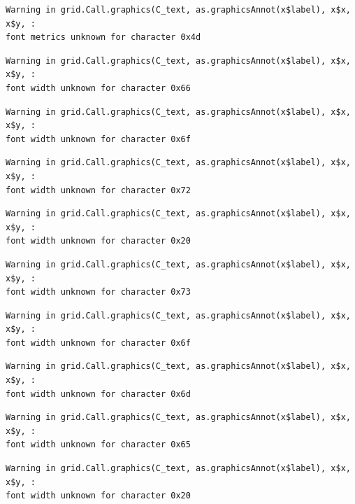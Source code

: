 \documentclass[
  letterpaper,
  DIV=11,
  numbers=noendperiod]{scrreprt}
\begin{document}
\begin{verbatim}
Warning in grid.Call.graphics(C_text, as.graphicsAnnot(x$label), x$x, x$y, :
font metrics unknown for character 0x4d
\end{verbatim}

\begin{verbatim}
Warning in grid.Call.graphics(C_text, as.graphicsAnnot(x$label), x$x, x$y, :
font width unknown for character 0x66
\end{verbatim}

\begin{verbatim}
Warning in grid.Call.graphics(C_text, as.graphicsAnnot(x$label), x$x, x$y, :
font width unknown for character 0x6f
\end{verbatim}

\begin{verbatim}
Warning in grid.Call.graphics(C_text, as.graphicsAnnot(x$label), x$x, x$y, :
font width unknown for character 0x72
\end{verbatim}

\begin{verbatim}
Warning in grid.Call.graphics(C_text, as.graphicsAnnot(x$label), x$x, x$y, :
font width unknown for character 0x20
\end{verbatim}

\begin{verbatim}
Warning in grid.Call.graphics(C_text, as.graphicsAnnot(x$label), x$x, x$y, :
font width unknown for character 0x73
\end{verbatim}

\begin{verbatim}
Warning in grid.Call.graphics(C_text, as.graphicsAnnot(x$label), x$x, x$y, :
font width unknown for character 0x6f
\end{verbatim}

\begin{verbatim}
Warning in grid.Call.graphics(C_text, as.graphicsAnnot(x$label), x$x, x$y, :
font width unknown for character 0x6d
\end{verbatim}

\begin{verbatim}
Warning in grid.Call.graphics(C_text, as.graphicsAnnot(x$label), x$x, x$y, :
font width unknown for character 0x65
\end{verbatim}

\begin{verbatim}
Warning in grid.Call.graphics(C_text, as.graphicsAnnot(x$label), x$x, x$y, :
font width unknown for character 0x20
\end{verbatim}
\end{document}
